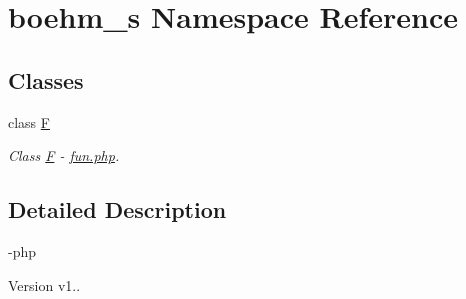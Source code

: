 \hypertarget{namespaceboehm__s}{}\section{boehm\+\_\+s Namespace Reference}
\label{namespaceboehm__s}
\subsection*{Classes}
\begin{DoxyCompactItemize}
\item 
class \hyperlink{classboehm__s_1_1F}{F}
\begin{DoxyCompactList}\small\item\em Class \hyperlink{classboehm__s_1_1F}{F} -\/ \hyperlink{fun_8php}{fun.\+php}. \end{DoxyCompactList}\end{DoxyCompactItemize}


\subsection{Detailed Description}
-\/php \begin{DoxyVersion}{Version}
v1.. 
\end{DoxyVersion}
